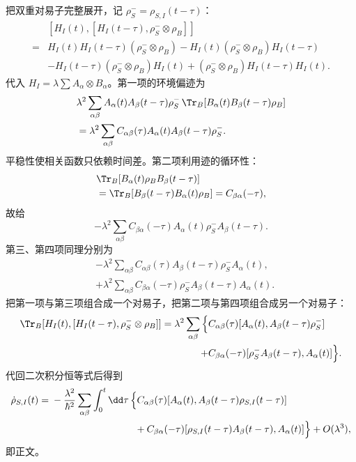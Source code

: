 \begin{derivation}[弱耦合展开怎样保留环境记忆]
把双重对易子完整展开，记
$\rho_S^-=\rho_{S,I}(t-\tau)$：
\begin{align*}
&[H_I(t),[H_I(t-\tau),\rho_S^-\otimes\rho_B]]\\
={}&H_I(t)H_I(t-\tau)(\rho_S^-\otimes\rho_B)
-H_I(t)(\rho_S^-\otimes\rho_B)H_I(t-\tau)\\
&-H_I(t-\tau)(\rho_S^-\otimes\rho_B)H_I(t)
+(\rho_S^-\otimes\rho_B)H_I(t-\tau)H_I(t).
\end{align*}
代入 $H_I=\lambda\sum A_\alpha\otimes B_\alpha$。第一项的环境偏迹为
\begin{align*}
&\lambda^2\sum_{\alpha\beta}
A_\alpha(t)A_\beta(t-\tau)\rho_S^-\,
\Tr_B[B_\alpha(t)B_\beta(t-\tau)\rho_B]\\
&=\lambda^2\sum_{\alpha\beta}
C_{\alpha\beta}(\tau)
A_\alpha(t)A_\beta(t-\tau)\rho_S^-.
\end{align*}
平稳性使相关函数只依赖时间差。第二项利用迹的循环性：
\begin{align*}
&\Tr_B[B_\alpha(t)\rho_BB_\beta(t-\tau)]\\
&=\Tr_B[B_\beta(t-\tau)B_\alpha(t)\rho_B]
=C_{\beta\alpha}(-\tau),
\end{align*}
故给
\[
-\lambda^2\sum_{\alpha\beta}
C_{\beta\alpha}(-\tau)
A_\alpha(t)\rho_S^-A_\beta(t-\tau).
\]
第三、第四项同理分别为
\begin{align*}
&-\lambda^2\sum_{\alpha\beta}
C_{\alpha\beta}(\tau)
A_\beta(t-\tau)\rho_S^-A_\alpha(t),\\
&+\lambda^2\sum_{\alpha\beta}
C_{\beta\alpha}(-\tau)
\rho_S^-A_\beta(t-\tau)A_\alpha(t).
\end{align*}
把第一项与第三项组合成一个对易子，把第二项与第四项组合成另一个对易子：
\begin{align*}
\Tr_B[H_I(t),[H_I(t-\tau),\rho_S^-\otimes\rho_B]]
=\lambda^2\sum_{\alpha\beta}\Big\{&
C_{\alpha\beta}(\tau)
[A_\alpha(t),A_\beta(t-\tau)\rho_S^-]\\
+&C_{\beta\alpha}(-\tau)
[\rho_S^-A_\beta(t-\tau),A_\alpha(t)]\Big\}.
\end{align*}
代回二次积分恒等式后得到
\begin{align*}
\dot\rho_{S,I}(t)
={}&-\frac{\lambda^2}{\hbar^2}
\sum_{\alpha\beta}\int_0^t\dd\tau\,\Big\{
C_{\alpha\beta}(\tau)
[A_\alpha(t),A_\beta(t-\tau)\rho_{S,I}(t-\tau)]\\
&\hspace{30mm}+C_{\beta\alpha}(-\tau)
[\rho_{S,I}(t-\tau)A_\beta(t-\tau),A_\alpha(t)]\Big\}
+O(\lambda^3),
\end{align*}
即正文。
\end{derivation}

